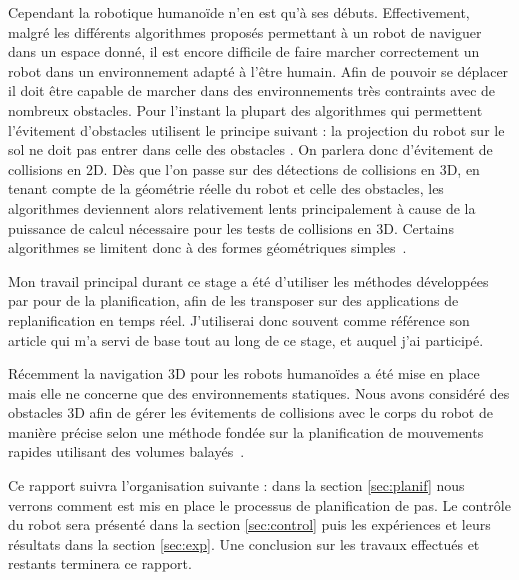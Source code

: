 Cependant la robotique humanoïde n'en est qu'à ses débuts. Effectivement, malgré les différents algorithmes proposés permettant à un robot de naviguer dans un espace donné, il est encore difficile de faire marcher correctement un robot dans un environnement adapté à l'être humain. 
Afin de pouvoir se déplacer il doit être capable de marcher dans des environnements très contraints avec de nombreux obstacles. 
Pour l'instant la plupart des algorithmes qui permettent l'évitement d'obstacles utilisent le principe suivant : la projection du robot sur le sol ne doit pas entrer dans celle des obstacles \cite{Chestnutt:ICRA:2005}. On parlera donc d'évitement de collisions en 2D. 
Dès que l'on passe sur des détections de collisions en 3D, en tenant compte de la géométrie réelle du robot et celle des obstacles, les algorithmes deviennent alors relativement lents principalement à cause de la puissance de calcul nécessaire pour les tests de collisions en 3D. Certains algorithmes se limitent donc à des formes géométriques simples~\cite{gutmann:ijrr:2008}.

Mon travail principal durant ce stage a été d'utiliser les méthodes développées par \nicolas pour de la planification, afin de les transposer sur des applications de replanification en temps réel. J'utiliserai donc souvent comme référence son article \cite{perrin:TRO:2011} qui m'a servi de base tout au long de ce stage, et auquel j'ai participé.

Récemment la navigation 3D pour les robots humanoïdes \cite{Chestnutt:IROS:2009,Chestnutt:MPHR:2010} a été mise en place mais elle ne concerne que des environnements statiques. Nous avons considéré des obstacles 3D afin de gérer les évitements de collisions avec le corps du robot de manière précise selon une méthode fondée sur la planification de mouvements rapides utilisant des volumes balayés~\cite{perrin:TRO:2011}.
\vspace{4mm}

Ce rapport suivra l'organisation suivante : dans la section \ref{sec:planif} nous verrons comment est mis en place le processus de planification de pas. Le contrôle du robot sera présenté dans la section \ref{sec:control} puis les expériences et leurs résultats dans la section \ref{sec:exp}. Une conclusion sur les travaux effectués et restants terminera ce rapport.

